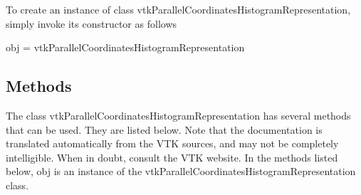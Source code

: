 To create an instance of class vtk\-Parallel\-Coordinates\-Histogram\-Representation, simply invoke its constructor as follows \begin{DoxyVerb}  obj = vtkParallelCoordinatesHistogramRepresentation
\end{DoxyVerb}
 \hypertarget{vtkwidgets_vtkxyplotwidget_Methods}{}\subsection{Methods}\label{vtkwidgets_vtkxyplotwidget_Methods}
The class vtk\-Parallel\-Coordinates\-Histogram\-Representation has several methods that can be used. They are listed below. Note that the documentation is translated automatically from the V\-T\-K sources, and may not be completely intelligible. When in doubt, consult the V\-T\-K website. In the methods listed below, {\ttfamily obj} is an instance of the vtk\-Parallel\-Coordinates\-Histogram\-Representation class. 
